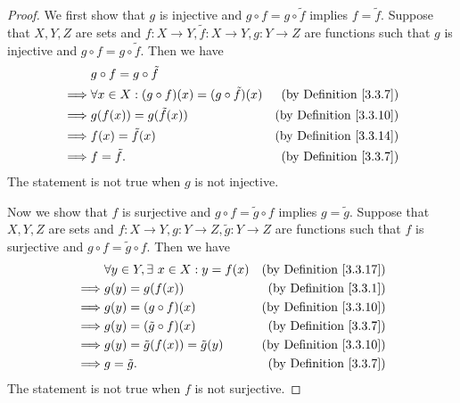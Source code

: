 \begin{proof}
    We first show that \(g\) is injective and \(g \circ f = g \circ \tilde{f}\) implies \(f = \tilde{f}\).
    Suppose that \(X, Y, Z\) are sets and \(f : X \to Y, \tilde{f} : X \to Y, g : Y \to Z\) are functions such that \(g\) is injective and \(g \circ f = g \circ \tilde{f}\).
    Then we have
    \begin{align*}
                 & g \circ f = g \circ \tilde{f}                                                                   \\
        \implies & \forall x \in X : (g \circ f)(x) = (g \circ \tilde{f})(x) & \text{(by Definition \ref{3.3.7})}  \\
        \implies & g(f(x)) = g(\tilde{f}(x))                                 & \text{(by Definition \ref{3.3.10})} \\
        \implies & f(x) = \tilde{f}(x)                                       & \text{(by Definition \ref{3.3.14})} \\
        \implies & f = \tilde{f}.                                            & \text{(by Definition \ref{3.3.7})}
    \end{align*}
    The statement is not true when \(g\) is not injective.

    Now we show that \(f\) is surjective and \(g \circ f = \tilde{g} \circ f\) implies \(g = \tilde{g}\).
    Suppose that \(X, Y, Z\) are sets and \(f : X \to Y, g : Y \to Z, \tilde{g} : Y \to Z\) are functions such that \(f\) is surjective and \(g \circ f = \tilde{g} \circ f\).
    Then we have
    \begin{align*}
                 & \forall y \in Y, \exists\ x \in X : y = f(x) & \text{(by Definition \ref{3.3.17})} \\
        \implies & g(y) = g(f(x))                               & \text{(by Definition \ref{3.3.1})}  \\
        \implies & g(y) = (g \circ f)(x)                        & \text{(by Definition \ref{3.3.10})} \\
        \implies & g(y) = (\tilde{g} \circ f)(x)                & \text{(by Definition \ref{3.3.7})}  \\
        \implies & g(y) = \tilde{g}(f(x)) = \tilde{g}(y)        & \text{(by Definition \ref{3.3.10})} \\
        \implies & g = \tilde{g}.                               & \text{(by Definition \ref{3.3.7})}
    \end{align*}
    The statement is not true when \(f\) is not surjective.
\end{proof}

